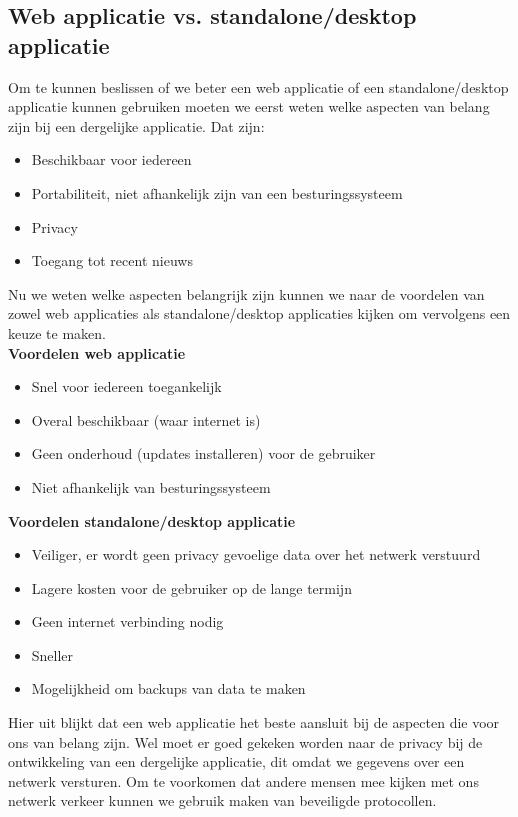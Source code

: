 \documentclass[twoside,openright]{uva-bachelor-thesis}
\begin{document}
		\subsection{Web applicatie vs. standalone/desktop applicatie}
			Om te kunnen beslissen of we beter een web applicatie of een standalone/desktop applicatie kunnen gebruiken moeten we eerst weten welke aspecten van belang zijn bij een dergelijke applicatie. Dat zijn:
			\begin{itemize}
				\item Beschikbaar voor iedereen
				\item Portabiliteit, niet afhankelijk zijn van een besturingssysteem
				\item Privacy
				\item Toegang tot recent nieuws
			\end{itemize}
			Nu we weten welke aspecten belangrijk zijn kunnen we naar de voordelen van zowel web applicaties als standalone/desktop applicaties kijken om vervolgens een keuze te maken.\\[0.5cm]
			\textbf{Voordelen web applicatie}
			\begin{itemize}
				\item Snel voor iedereen toegankelijk
				\item Overal beschikbaar (waar internet is)
				\item Geen onderhoud (updates installeren) voor de gebruiker
				\item Niet afhankelijk van besturingssysteem
			\end{itemize}
			\textbf{Voordelen standalone/desktop applicatie}
			\begin{itemize}
				\item Veiliger, er wordt geen privacy gevoelige data over het netwerk verstuurd
				\item Lagere kosten voor de gebruiker op de lange termijn
				\item Geen internet verbinding nodig
				\item Sneller
				\item Mogelijkheid om backups van data te maken
			\end{itemize}
			Hier uit blijkt dat een web applicatie het beste aansluit bij de aspecten die voor ons van belang zijn. Wel moet er goed gekeken worden naar de privacy bij de ontwikkeling van een dergelijke applicatie, dit omdat we gegevens over een netwerk versturen. Om te voorkomen dat andere mensen mee kijken met ons netwerk verkeer kunnen we gebruik maken van beveiligde protocollen.
\end{document}
